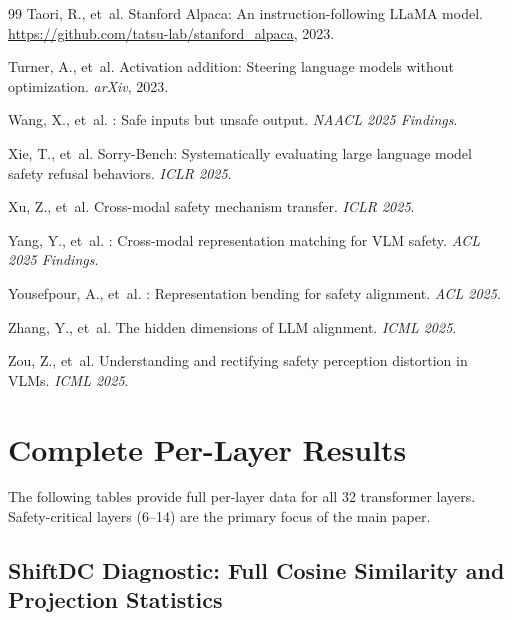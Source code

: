 \documentclass{article}
\begin{document}
\begin{thebibliography}{99}
Taori, R., et~al.
\newblock Stanford {Alpaca}: An instruction-following {LLaMA} model.
\newblock \url{https://github.com/tatsu-lab/stanford_alpaca}, 2023.

Turner, A., et~al.
\newblock Activation addition: Steering language models without optimization.
\newblock \emph{arXiv}, 2023.

Wang, X., et~al.
: Safe inputs but unsafe output.
\newblock \emph{NAACL 2025 Findings}.

Xie, T., et~al.
\newblock Sorry-{Bench}: Systematically evaluating large language model safety
  refusal behaviors.
\newblock \emph{ICLR 2025}.

Xu, Z., et~al.
\newblock Cross-modal safety mechanism transfer.
\newblock \emph{ICLR 2025}.

Yang, Y., et~al.
: Cross-modal representation matching for {VLM} safety.
\newblock \emph{ACL 2025 Findings}.

Yousefpour, A., et~al.
: Representation bending for safety alignment.
\newblock \emph{ACL 2025}.

Zhang, Y., et~al.
\newblock The hidden dimensions of {LLM} alignment.
\newblock \emph{ICML 2025}.

Zou, Z., et~al.
\newblock Understanding and rectifying safety perception distortion in {VLMs}.
\newblock \emph{ICML 2025}.

\end{thebibliography}

\appendix

\section{Complete Per-Layer Results}
\label{app:tables}

The following tables provide full per-layer data for all 32 transformer layers.
Safety-critical layers (6--14) are the primary focus of the main paper.

\subsection{ShiftDC Diagnostic: Full Cosine Similarity and Projection Statistics}
\label{app:agg_full}
\end{document}
